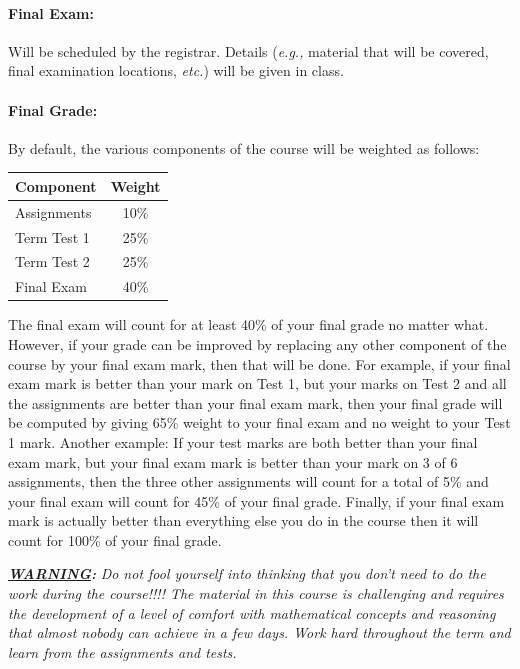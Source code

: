 \documentclass[12pt]{article}
\newcommand{\eg}{\emph{e.g.,\/}\xspace}
\newcommand{\etc}{\emph{etc.\/}\xspace}
\begin{document}
\paragraph*{Final Exam:} Will be scheduled by the registrar. Details (\eg material that will be covered, final examination locations, \etc) will be given in class.

\paragraph*{Final Grade:}
By default, the various components of the course will be weighted as follows:
%
\begin{center}
\begin{tabular}{l|c}
\bf Component & \bf Weight \\\hline
Assignments & 10\% \\
Term Test 1 & 25\% \\
Term Test 2 & 25\% \\
Final Exam & 40\%
\end{tabular}
\end{center}
The final exam will count for at least 40\% of your final grade no matter what.  However, if your grade can be improved by replacing any other component of the course by your final exam mark, then that will be done.  For example, if your final exam mark is better than your mark on Test 1, but your marks on Test 2 and all the assignments are better than your final exam mark, then your final grade will be computed by giving 65\% weight to your final exam and no weight to your Test 1 mark.  Another example: If your test marks are both better than your final exam mark, but your final exam mark is better than your mark on 3 of 6 assignments, then the three other assignments will count for a total of 5\% and your final exam will count for 45\% of your final grade.  Finally, if your final exam mark is actually better than everything else you do in the course then it will count for 100\% of your final grade.  

\smallskip
\noindent
{\bfseries\slshape\underline{WARNING}:} \emph{Do not fool yourself into thinking that you don't need to do the work during the course!!!!  The material in this course is challenging and requires the development of a level of comfort with mathematical concepts and reasoning that almost nobody can achieve in a few days.  Work hard throughout the term and learn from the assignments and tests.}
\end{document}
